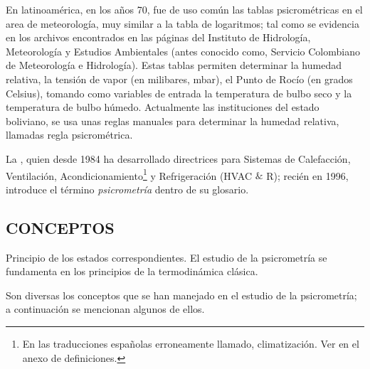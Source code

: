 En latinoamérica, en los años 70, fue de uso común las tablas psicrométricas en el area de meteorología, muy similar a la tabla de logaritmos; tal como se evidencia en los archivos encontrados en las páginas del Instituto de Hidrología, Meteorología y Estudios Ambientales (antes conocido como, Servicio Colombiano de Meteorología e Hidrología). Estas tablas permiten determinar la humedad relativa, la tensión de vapor (en milibares, mbar), el Punto de Rocío (en grados Celsius), tomando como variables de entrada la temperatura de bulbo seco y la temperatura de bulbo húmedo. Actualmente las instituciones del estado boliviano, se usa unas reglas manuales para determinar la humedad relativa, llamadas regla psicrométrica.

La , quien desde 1984 ha desarrollado directrices para Sistemas de Calefacción, Ventilación, Acondicionamiento\footnote[1]{En las traducciones españolas erroneamente llamado, climatización. Ver en el anexo de definiciones.} y Refrigeración (HVAC $\&$ R); recién en 1996, introduce el término \textit{psicrometría} dentro de su glosario.



\subsection*{CONCEPTOS}

Principio de los estados correspondientes.
El estudio de la psicrometría se fundamenta en los principios de la termodinámica clásica.



Son diversas los conceptos que se han manejado en el estudio de la psicrometría; a continuación se mencionan algunos de ellos.

